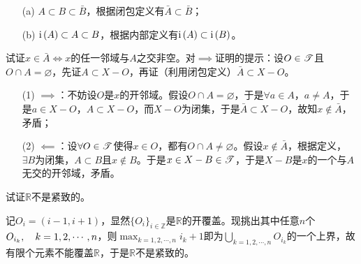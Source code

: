 \begin{xiti}
	\begin{zm}
		\begin{enumerate}
			\item[(a)] $A\subset B\subset\bar{B} $，根据闭包定义有$\bar{A}\subset\bar{B} $；
			\item[(b)] $\mathrm{i}\left( A \right)\subset A\subset B $，根据内部定义有$\mathrm{i}\left( A \right)\subset \mathrm{i}\left( B \right) $。
		\end{enumerate}
	\end{zm}
	
	\item 试证$x\in \bar{A}\iff x $的任一邻域与$A$之交非空。对$\implies$证明的提示：设$O\in \mathscr{T}$且$O\cap A=\varnothing$，先证$A\subset X-O$，再证（利用闭包定义）$\bar{A}\subset X-O$。
	
	\begin{zm}
		\begin{enumerate}
			\item[(1)] $\implies$：不妨设$O$是$x$的开邻域。假设$O\cap A=\varnothing$，于是$\forall a\in A$，$a\neq A $，于是$a\in X-O$，$A\subset X-O$，而$X-O$为闭集，于是$\bar{A}\subset X-O$，故知$x\notin\bar{A} $，矛盾；
			\item[(2)] $\impliedby$：设$\forall O\in \mathscr{T}$使得$x\in O$，都有$O\cap A\neq \varnothing$。假设$x\notin \bar{A}$，根据定义，$\exists B$为闭集，$A\subset B$且$x\notin B$。于是$x\in X-B \in\mathscr{T}$，于是$X-B$是$x$的一个与$A$无交的开邻域，矛盾。
		\end{enumerate}
	\end{zm}
	
	\item 试证$\mathbb{R}$不是紧致的。
	
	\begin{zm}
		记$O_i=(i-1,i+1)$，显然$\{O_i\}_{i\in\mathbb{Z}}$是$\mathbb{R}$的开覆盖。现挑出其中任意$n$个$O_{i_k}\qc k=1,2,\cdots,n$，则$\displaystyle\max_{k=1,2,\cdots,n} i_k+1$即为$\displaystyle\bigcup_{k=1,2,\cdots,n}O_{i_k} $的一个上界，故有限个元素不能覆盖$\mathbb{R}$，于是$\mathbb{R}$不是紧致的。
	\end{zm}
	
	
	
	
	
	
	
	
	
\end{xiti}